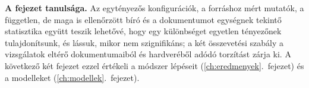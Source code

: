 \bigskip
\noindent\textbf{A fejezet tanulsága.} Az egytényezős konfigurációk, a forráshoz mért mutatók, a
független, de maga is ellenőrzött bíró és a dokumentumot egységnek tekintő statisztika együtt teszik
lehetővé, hogy egy különbséget egyetlen tényezőnek tulajdonítsunk, és lássuk, mikor nem szignifikáns; a
két összevetési szabály a vizsgálatok eltérő dokumentumaiból és hardveréből adódó torzítást zárja ki. A
következő két fejezet ezzel értékeli a módszer lépéseit (\ref{ch:eredmenyek}.~fejezet) és a modelleket
(\ref{ch:modellek}.~fejezet).
